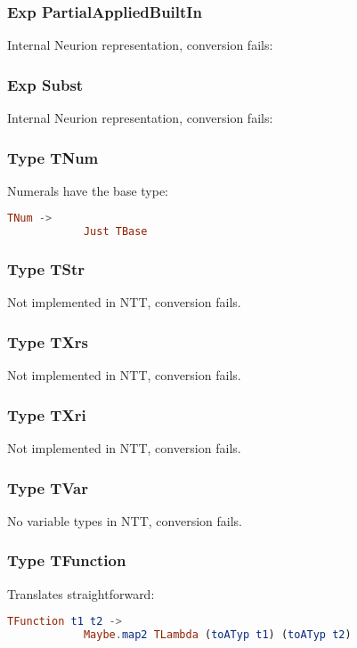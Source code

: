 \documentclass[10pt,a4paper,english]{article}
\begin{document}
\subsubsection*{Exp PartialAppliedBuiltIn}
Internal Neurion representation, conversion fails:

\subsubsection*{Exp Subst}
Internal Neurion representation, conversion fails:

\subsubsection*{Type TNum}
Numerals have the base type:
\begin{lstlisting}[language=elm,%
                     label="eval-evaluated",%
                     gobble=8,%
                     ]
        TNum ->
            Just TBase
\end{lstlisting}

\subsubsection*{Type TStr}
Not implemented in NTT, conversion fails.

\subsubsection*{Type TXrs}
Not implemented in NTT, conversion fails.

\subsubsection*{Type TXri}
Not implemented in NTT, conversion fails.

\subsubsection*{Type TVar}
No variable types in NTT, conversion fails.

\subsubsection*{Type TFunction}
Translates straightforward:
\begin{lstlisting}[language=elm,%
                     label="eval-evaluated",%
                     gobble=8,%
                     ]
        TFunction t1 t2 ->
            Maybe.map2 TLambda (toATyp t1) (toATyp t2)
\end{lstlisting}
\end{document}
